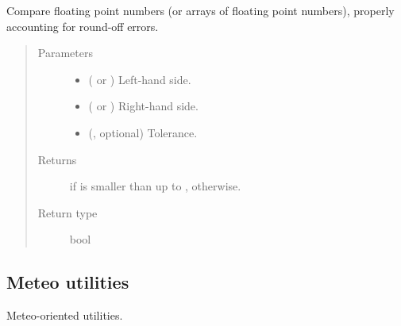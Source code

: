 \documentclass[letterpaper,10pt,english]{sphinxmanual}
\begin{document}
\begin{fulllineitems}
\label{\detokenize{api:utils.utils.smaller_than}}
Compare floating point numbers (or arrays of floating point numbers), properly accounting for round-off errors.
\begin{quote}\begin{description}
\item[{Parameters}] \leavevmode\begin{itemize}
\item {} 
 ( or ) \textendash{} Left-hand side.

\item {} 
 ( or ) \textendash{} Right-hand side.

\item {} 
 (, optional) \textendash{} Tolerance.

\end{itemize}

\item[{Returns}] \leavevmode
{} if  is smaller than  up to ,  otherwise.

\item[{Return type}] \leavevmode
bool

\end{description}\end{quote}

\end{fulllineitems}



\subsection{Meteo utilities}
\label{\detokenize{api:meteo-utilities}}\label{\detokenize{api:module-utils.utils_meteo}}
Meteo-oriented utilities.
\end{document}
